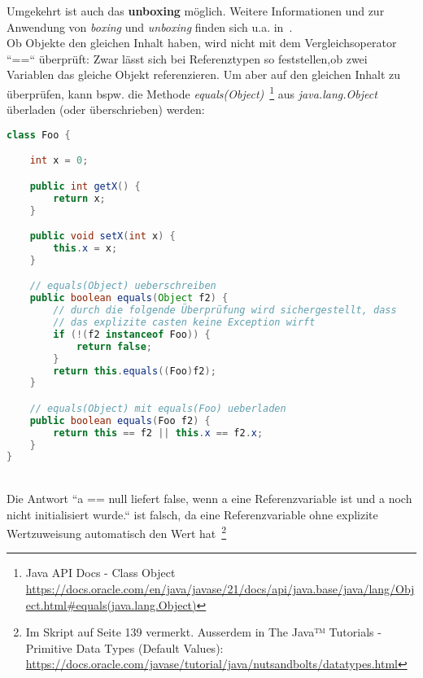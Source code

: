 Umgekehrt ist auch das \textbf{unboxing} möglich. Weitere Informationen und zur Anwendung von \textit{boxing} und \textit{unboxing}
finden sich u.a. in~\cite[732 ff]{Ull12}.\\

Ob Objekte den gleichen Inhalt haben, wird nicht mit dem Vergleichsoperator ``==`` überprüft: Zwar lässt sich bei Referenztypen
so feststellen,ob zwei Variablen das gleiche Objekt referenzieren. Um aber auf den gleichen Inhalt zu überprüfen, kann
bspw. die Methode \textit{equals(Object)}~\footnote{
    Java API Docs - Class Object \url{https://docs.oracle.com/en/java/javase/21/docs/api/java.base/java/lang/Object.html#equals(java.lang.Object)}
} aus \textit{java.lang.Object} überladen (oder überschrieben) werden:\\


\begin{lstlisting}[language=java]
class Foo {

    int x = 0;

    public int getX() {
        return x;
    }

    public void setX(int x) {
        this.x = x;
    }

    // equals(Object) ueberschreiben
    public boolean equals(Object f2) {
        // durch die folgende Überprüfung wird sichergestellt, dass
        // das explizite casten keine Exception wirft
        if (!(f2 instanceof Foo)) {
            return false;
        }
        return this.equals((Foo)f2);
    }

    // equals(Object) mit equals(Foo) ueberladen
    public boolean equals(Foo f2) {
        return this == f2 || this.x == f2.x;
    }
}
\end{lstlisting}\\

Die Antwort ``a == null liefert false, wenn a eine Referenzvariable ist und a noch nicht initialisiert wurde.`` ist falsch,
da eine Referenzvariable ohne explizite Wertzuweisung automatisch den Wert  hat~\footnote{Im Skript auf Seite 139 vermerkt. Ausserdem in The Java™ Tutorials - Primitive Data Types (Default Values): \url{https://docs.oracle.com/javase/tutorial/java/nutsandbolts/datatypes.html}}